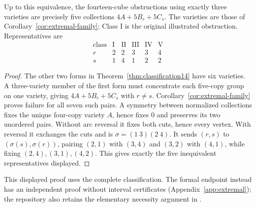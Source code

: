 

\begin{theorem}\label{thm:three-variety-classification}
Up to this equivalence, the fourteen-cube obstructions using exactly three
varieties are precisely five collections $4A+5B_r+5C_s$. The varieties are those of Corollary~\ref{cor:extremal-family};
Class I is the original illustrated obstruction. Representatives are
\[
\begin{array}{c|ccccc}
 \text{class}&\mathrm{I}&\mathrm{II}&\mathrm{III}&\mathrm{IV}&\mathrm{V}\\\hline
 r&2&2&3&3&4\\
 s&1&4&1&2&2
\end{array}
\]
\end{theorem}
\begin{proof}
The other two forms in Theorem~\ref{thm:classification14} have six varieties.
A three-variety member of the first form must concentrate each five-copy
group on one variety, giving $4A+5B_r+5C_s$ with $r\ne s$.
Corollary~\ref{cor:extremal-family} proves failure for all seven such pairs.
A symmetry between normalized collections fixes the unique
four-copy variety $A$, hence fixes $0$ and preserves its two unordered
pairs. Without arc reversal it fixes both cuts, hence every vertex.
With reversal it exchanges the cuts and is $\sigma=(1\ 3)(2\ 4)$.
It sends $(r,s)$ to $(\sigma(s),\sigma(r))$, pairing $(2,1)$ with $(3,4)$
and $(3,2)$ with $(4,1)$, while fixing $(2,4),(3,1),(4,2)$.
This gives exactly the five inequivalent representatives displayed.
\end{proof}
This displayed proof uses the complete classification. The formal endpoint
instead has an independent proof without interval certificates
(Appendix~\ref{app:extremal}); the repository also retains the elementary
necessity argument in .
